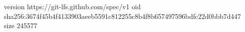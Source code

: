 version https://git-lfs.github.com/spec/v1
oid sha256:3674f45b4f4133903aeeb5591c812255c8b4f8b657497596bdfc22d0bbb7d447
size 245577
